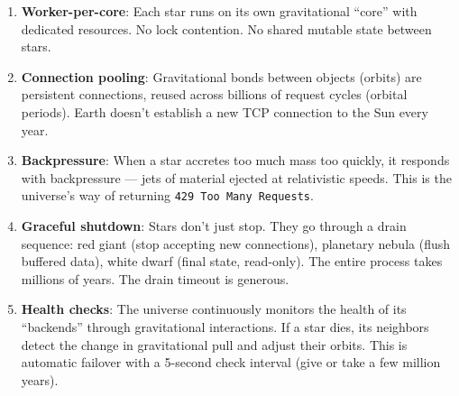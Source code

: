 \documentclass[12pt,a4paper]{article}
\begin{document}
\begin{enumerate}
    \item \textbf{Worker-per-core}: Each star runs on its own gravitational
    ``core'' with dedicated resources. No lock contention. No shared mutable
    state between stars.

    \item \textbf{Connection pooling}: Gravitational bonds between objects
    (orbits) are persistent connections, reused across billions of request
    cycles (orbital periods). Earth doesn't establish a new TCP connection
    to the Sun every year.

    \item \textbf{Backpressure}: When a star accretes too much mass too
    quickly, it responds with backpressure --- jets of material ejected at
    relativistic speeds. This is the universe's way of returning
    \texttt{429 Too Many Requests}.

    \item \textbf{Graceful shutdown}: Stars don't just stop. They go through
    a drain sequence: red giant (stop accepting new connections), planetary
    nebula (flush buffered data), white dwarf (final state, read-only). The
    entire process takes millions of years. The drain timeout is generous.

    \item \textbf{Health checks}: The universe continuously monitors the
    health of its ``backends'' through gravitational interactions. If a star
    dies, its neighbors detect the change in gravitational pull and adjust
    their orbits. This is automatic failover with a 5-second check interval
    (give or take a few million years).
\end{enumerate}
\end{document}
